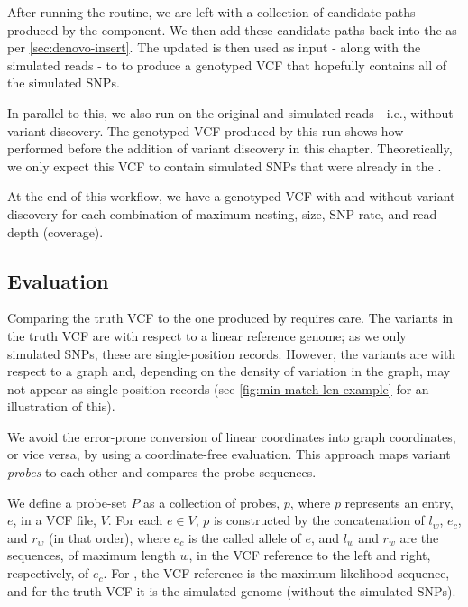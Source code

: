 After running the  routine, we are left with a collection of candidate paths produced by the \denovo{} component. We then add these candidate paths back into the \panrg{} as per \autoref{sec:denovo-insert}. The updated \panrg{} is then used as input - along with the simulated reads - to \pandora{}  to produce a genotyped VCF that hopefully contains all of the simulated SNPs.

In parallel to this, we also run \pandora{}  on the original \panrg{} and simulated reads - i.e., without variant discovery. The genotyped VCF produced by this run shows how \pandora{} performed before the addition of \denovo{} variant discovery in this chapter. Theoretically, we only expect this VCF to contain simulated SNPs that were already in the \panrg{}.

At the end of this workflow, we have a genotyped VCF with and without \denovo{} variant discovery for each combination of maximum nesting, \denovo{} \kmer{} size, SNP rate, and read depth (coverage).

\subsection{Evaluation}
\label{sec:denovo-sims-eval}

Comparing the truth VCF to the one produced by \pandora{} requires care. The variants in the truth VCF are with respect to a linear reference genome; as we only simulated SNPs, these are single-position records. However, the \pandora{} variants are with respect to a graph and, depending on the density of variation in the graph, may not appear as single-position records (see \autoref{fig:min-match-len-example} for an illustration of this). 

We avoid the error-prone conversion of linear coordinates into graph coordinates, or vice versa, by using a coordinate-free evaluation. This approach maps variant \emph{probes} to each other and compares the probe sequences.  

We define a probe-set $P$ as a collection of probes, $p$, where $p$ represents an entry, $e$, in a VCF file, $V$. For each $e \in V$, $p$ is constructed by the concatenation of $l_w$, $e_c$, and $r_w$ (in that order), where $e_c$ is the called allele of $e$, and $l_w$ and $r_w$ are the sequences, of maximum length $w$, in the VCF reference to the left and right, respectively, of $e_c$. For \pandora{}, the VCF reference is the maximum likelihood sequence, and for the truth VCF it is the simulated genome (without the simulated SNPs).

